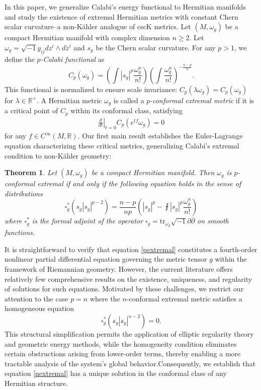 \documentclass[12pt]{amsart}
\theoremstyle{plain}
\newtheorem{thm}{Theorem}[section]
\theoremstyle{definition}
\newcommand{\sq}{\sqrt{-1}}
\newcommand{\p}{\partial}
\renewcommand{\bar}{\overline}
\newcommand{\beq}{\begin{equation}}
\newcommand{\eeq}{\end{equation}}
\renewcommand{\>}{\rightarrow}
\newcommand{\R}{{\mathbb R}}
\renewcommand{\#}{\sharp}
\newcommand{\pdd}{\left.\frac{d}{dt}\right|_{t=0}}
\newcommand{\lrp}[1]{\left( #1\right)}
\numberwithin{equation}{section} %
\begin{document}
    In this paper, we generalize Calabi's energy functional to Hermitian manifolds and study the existence of extremal Hermitian metrics with constant Chern scalar curvature--a non-K\"ahler analogue of cscK metrics. Let $(M,\omega_g)$ be a compact Hermitian manifold with complex dimension $n\geq 2$. Let $\omega_g=\sq g_{i\bar j}d z^i\wedge d\bar z^j$ and $s_g$ be the Chern scalar curvature.  For any $p>1$, we define the \emph{$p$-Calabi functional}  as
\beq
    C_{p}(\omega_g)=\lrp{\int |s_g|^p\frac{\omega_g^n}{n!}}\lrp{\int\frac{\omega_g^n}{n!}}^{-\frac{n-p}{n}}.
\eeq
This functional is normalized to ensure scale invariance: $ C_{p}(\lambda\omega_g)=C_p(\omega_g)$ for $\lambda\in \R^+$.
A Hermitian metric $\omega_g$ is called a \textit{$p$-conformal extremal metric} if  it is a critical point of  $C_p$ within its conformal class, satisfying
    \begin{align}
    \pdd C_{p}(e^{tf}\omega_g)=0
    \end{align}
    for any $ f\in C^\infty(M,\R)$. Our first main result establishes the Euler-Lagrange equation characterizing these critical metrics, generalizing Calabi's extremal condition to non-K\"ahler geometry:

\begin{thm}\label{thm1}
    Let $(M,\omega_g)$ be a compact Hermitian manifold. Then $\omega_g$ is $p$-conformal extremal
    if and only if the following equation holds in the sense of distributions
    \beq
    \square_g^*\left(s_g|s_g|^{p-2}\right)=\frac{n-p}{np}\left(|s_g|^p-\intbar|s_g|^p\frac{\omega_g^n}{n!}\right)\label{pextremal}
    \eeq
    where $\square_g^*$ is the formal adjoint of the operator $\square_g=\mathrm{tr}_{\omega_g}\sq\p\bar\p$ on smooth functions.
\end{thm}

\noindent It is straightforward to verify that equation  \eqref{pextremal} constitutes a fourth-order nonlinear partial differential equation governing the metric tensor
$g$ within the framework of Riemannian geometry. However, the current literature offers relatively few comprehensive results on the existence, uniqueness, and regularity of solutions for such equations.  Motivated by these challenges, we restrict our attention to the case $p=n$ where the $n$-conformal extremal metric satisfies a homogeneous equation
    \beq
\square_g^*(s_g|s_g|^{n-2})=0.\label{nextremal}
\eeq This structural simplification permits the application of elliptic regularity theory and geometric energy methods, while the homogeneity condition eliminates certain obstructions arising from lower-order terms, thereby enabling a more tractable analysis of the system’s global behavior.Consequently, we establish that equation \eqref{nextremal} has a unique solution in the conformal class of any Hermitian structure.
\end{document}
